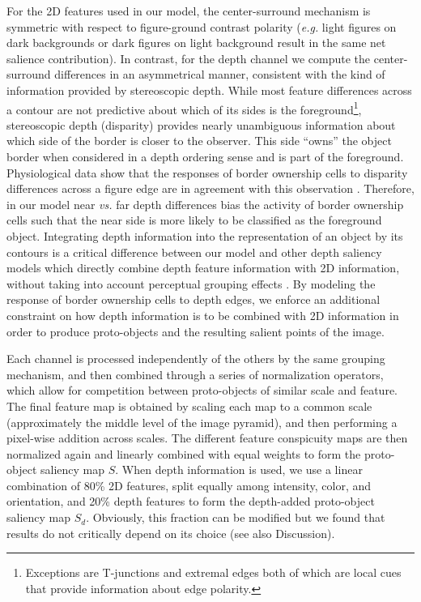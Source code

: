 \documentclass[12pt]{article}
\newcommand{\eg}[0]{{\em e.g.}\xspace}
\newcommand{\vs}[0]{{\em vs.}\xspace}
\begin{document}
For the 2D features used in our model, the center-surround mechanism
is symmetric with respect to figure-ground contrast polarity (\eg
light figures on dark backgrounds or dark figures on light background
result in the same net salience contribution). In contrast, for the
depth channel we compute the center-surround differences in an
asymmetrical manner, consistent with the kind of information
provided by stereoscopic depth.  While most feature differences across
a contour are not predictive about which of its sides is the
foreground\footnote{Exceptions are T-junctions \citep{Heitger_vonderHeydt93} and extremal edges \citep{Palmer_Ghose08,Ramenahalli_etal11a,Ramenahalli_etal12a,Ramenahalli_etal14a}
both of which are local cues that provide information about edge
polarity.\label{EEfootnote}}, stereoscopic depth (disparity)
provides nearly unambiguous information about which side of the border
is closer to the observer. This side ``owns'' the object border when
considered in a depth ordering sense and is part of the
foreground. Physiological data show that the responses of
border ownership cells to disparity differences across a figure edge
are in agreement with this observation
\citep{Zhou_etal00,Qiu_vonderHeydt05}. Therefore,
in our model near \vs far depth differences bias the activity of
border ownership cells such that the near side is more likely to be
classified as the foreground object.  Integrating depth information
into the representation of an object by its contours is a critical
difference between our model and other depth saliency models which
directly combine depth feature information with 2D information,
without taking into account perceptual grouping effects
\cite[\eg][]{Ouerhani_etal00,Jost_etal04,Hugli_etal05}.  By modeling
the response of border ownership cells to depth edges, we enforce an
additional constraint on how depth information is to be combined with
2D information in order to produce proto-objects and the resulting
salient points of the image.

Each channel is processed independently of the others by the same
grouping mechanism, and then combined through a series of
normalization operators, which allow for competition between
proto-objects of similar scale and feature. The final feature map is
obtained by scaling each map to a common scale (approximately the
middle level of the image pyramid), and then performing a pixel-wise
addition across scales. The different feature conspicuity maps are
then normalized again and linearly combined with equal weights to form
the proto-object saliency map $S$. When depth information is used, we
use a linear combination of 80\% 2D features, split equally among
intensity, color, and orientation, and 20\% depth features to form the
depth-added proto-object saliency map $S_d$.  Obviously, this fraction
can be modified but we found that results do not critically depend on
its choice (see also Discussion).
\end{document}
